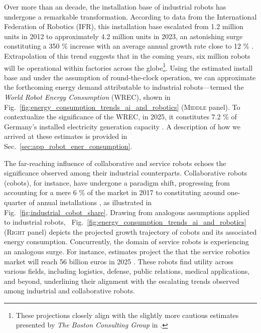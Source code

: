\documentclass[12pt]{article}
\begin{document}
Over more than an decade, the installation base of industrial robots has undergone a remarkable transformation. According to data from the International Federation of Robotics (IFR), this installation base escalated from 1.2 million units in 2012 to approximately 4.2 million units in 2023, an astonishing surge constituting a 350 \% increase with an average annual growth rate close to 12 \% \cite{IFR2024WorldRobotics2024}. Extrapolation of this trend suggests that in the coming years, six million robots will be operational within factories across the globe\footnote{These projections closely align with the slightly more cautious estimates presented by \textit{The Boston Consulting Group} in \cite{Sirkin2015HowRobotsWill}.}. Using the estimated install base and under the assumption of round-the-clock operation, we can approximate the forthcoming energy demand attributable to industrial robots---termed the \textit{World Robot Energy Consumption} (WREC), shown in~%
Fig.~\ref{fig:energy_consumption_trends_ai_and_robotics} (\textsc{Middle} panel). To contextualize the significance of the WREC, in 2025, it constitutes 7.2 \% of Germany's installed electricity generation capacity \cite{FraunhoferISENetinstalledelectricity}. A description of how we arrived at these estimates is provided in Sec.~\ref{sec:app_robot_ener_consumption}.

The far-reaching influence of collaborative and service robots echoes the significance observed among their industrial counterparts. Collaborative robots (cobots), for instance, have undergone a paradigm shift, progressing from accounting for a mere 6 \% of the market in 2017 to constituting around one-quarter of annual installations \cite{tobe2015}, as illustrated in Fig.~\ref{fig:industrial_cobot_share}. Drawing from analogous assumptions applied to industrial robots,~%
Fig.~\ref{fig:energy_consumption_trends_ai_and_robotics} (\textsc{Right} panel) depicts the projected growth trajectory of cobots and its associated energy consumption. Concurrently, the domain of service robots is experiencing an analogous surge. For instance, estimates project the that the service robotics market will reach 56 billion euros in 2025 \cite{statista_service_robots}. These robots find utility across various fields, including logistics, defense, public relations, medical applications, and beyond, underlining their alignment with the escalating trends observed among industrial and collaborative robots.
\end{document}
